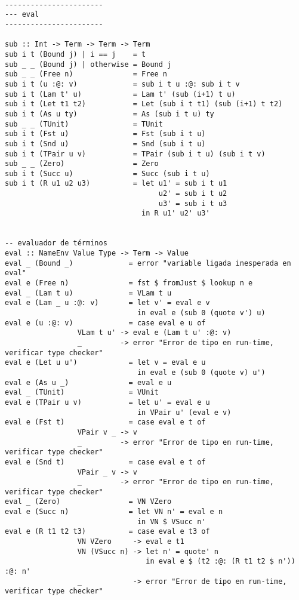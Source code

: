 \documentclass[a4paper]{report}
\begin{document}
\begin{lstlisting}

-----------------------
--- eval
-----------------------

sub :: Int -> Term -> Term -> Term
sub i t (Bound j) | i == j    = t
sub _ _ (Bound j) | otherwise = Bound j
sub _ _ (Free n)              = Free n
sub i t (u :@: v)             = sub i t u :@: sub i t v
sub i t (Lam t' u)            = Lam t' (sub (i+1) t u)
sub i t (Let t1 t2)           = Let (sub i t t1) (sub (i+1) t t2)
sub i t (As u ty)             = As (sub i t u) ty
sub _ _ (TUnit)               = TUnit
sub i t (Fst u)               = Fst (sub i t u)
sub i t (Snd u)               = Snd (sub i t u)
sub i t (TPair u v)           = TPair (sub i t u) (sub i t v)
sub _ _ (Zero)                = Zero
sub i t (Succ u)              = Succ (sub i t u)
sub i t (R u1 u2 u3)          = let u1' = sub i t u1
                                    u2' = sub i t u2
                                    u3' = sub i t u3
                                in R u1' u2' u3'


-- evaluador de términos
eval :: NameEnv Value Type -> Term -> Value
eval _ (Bound _)             = error "variable ligada inesperada en eval"
eval e (Free n)              = fst $ fromJust $ lookup n e
eval _ (Lam t u)             = VLam t u
eval e (Lam _ u :@: v)       = let v' = eval e v
                               in eval e (sub 0 (quote v') u)
eval e (u :@: v)             = case eval e u of
                 VLam t u' -> eval e (Lam t u' :@: v)
                 _         -> error "Error de tipo en run-time, verificar type checker"
eval e (Let u u')            = let v = eval e u
                               in eval e (sub 0 (quote v) u')
eval e (As u _)              = eval e u
eval _ (TUnit)               = VUnit
eval e (TPair u v)           = let u' = eval e u
                               in VPair u' (eval e v)
eval e (Fst t)               = case eval e t of
                 VPair v _ -> v
                 _         -> error "Error de tipo en run-time, verificar type checker"
eval e (Snd t)               = case eval e t of
                 VPair _ v -> v
                 _         -> error "Error de tipo en run-time, verificar type checker"
eval _ (Zero)                = VN VZero
eval e (Succ n)              = let VN n' = eval e n
                               in VN $ VSucc n'
eval e (R t1 t2 t3)          = case eval e t3 of
                 VN VZero     -> eval e t1
                 VN (VSucc n) -> let n' = quote' n
                                 in eval e $ (t2 :@: (R t1 t2 $ n')) :@: n'
                 _            -> error "Error de tipo en run-time, verificar type checker"


\end{lstlisting}
\end{document}
